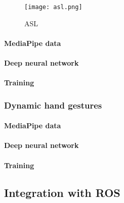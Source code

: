 \documentclass[../thesis.tex]{subfiles}
\begin{document}
\begin{figure}[H]
    \centering
    \texttt{[image: asl.png]}
    \caption{\glsdesc{ASL}~\parencite{img:asl}}\label{fig:asl}
\end{figure}

\paragraph{MediaPipe data}

\paragraph{Deep neural network}

\paragraph{Training}

\subsubsection{Dynamic hand gestures}

\paragraph{MediaPipe data}

\paragraph{Deep neural network}

\paragraph{Training}

\subsection{Integration with ROS}
\end{document}
